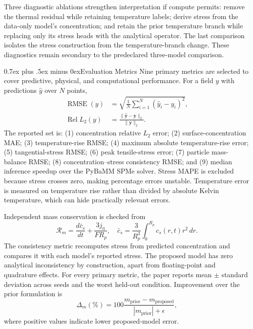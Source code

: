 \documentclass[conference]{IEEEtran}
\makeatletter
\newcommand{\headingfont}{\rmfamily}
\def\subsection{\@startsection{subsection}{2}{\z@}{1.5ex plus 1.5ex minus 0.5ex}%
{0.7ex plus .5ex minus 0ex}{\normalfont\headingfont\normalsize\bfseries}}
\makeatother
\begin{document}
Three diagnostic ablations strengthen interpretation if compute permits: remove the thermal residual while retaining temperature labels; derive stress from the data-only model's concentration; and retain the prior temperature branch while replacing only its stress heads with the analytical operator. The last comparison isolates the stress construction from the temperature-branch change. These diagnostics remain secondary to the predeclared three-model comparison.

\subsection{Evaluation Metrics}
Nine primary metrics are selected to cover predictive, physical, and computational performance. For a field $y$ with predictions $\widehat y$ over $N$ points,
\begin{align}
\operatorname{RMSE}(y)&=\sqrt{\frac{1}{N}\sum_{i=1}^{N}(\widehat y_i-y_i)^2},
\label{eq:rmse}\\
\operatorname{Rel}L_2(y)&=\frac{\|\widehat{\mathbf y}-\mathbf y\|_2}{\|\mathbf y\|_2}.
\label{eq:rell2}
\end{align}
The reported set is: (1) concentration relative $L_2$ error; (2) surface-concentration MAE; (3) temperature-rise RMSE; (4) maximum absolute temperature-rise error; (5) tangential-stress RMSE; (6) peak tensile-stress error; (7) particle mass-balance RMSE; (8) concentration--stress consistency RMSE; and (9) median inference speedup over the PyBaMM SPMe solver. Stress MAPE is excluded because stress crosses zero, making percentage errors unstable. Temperature error is measured on temperature rise rather than divided by absolute Kelvin temperature, which can hide practically relevant errors.

Independent mass conservation is checked from
\begin{equation}
\mathcal{R}_{m}=\frac{d\bar c_s}{dt}+\frac{3j_n}{FR_p},\quad
\bar c_s=\frac{3}{R_p^3}\int_0^{R_p}c_s(r,t)r^2\,dr.
\label{eq:mass}
\end{equation}
The consistency metric recomputes stress from predicted concentration and compares it with each model's reported stress. The proposed model has zero analytical inconsistency by construction, apart from floating-point and quadrature effects. For every primary metric, the paper reports mean $\pm$ standard deviation across seeds and the worst held-out condition. Improvement over the prior formulation is
\begin{equation}
\Delta_m(\%)=100\frac{m_{\mathrm{prior}}-m_{\mathrm{proposed}}}
{|m_{\mathrm{prior}}|+\epsilon},
\label{eq:gap}
\end{equation}
where positive values indicate lower proposed-model error.
\end{document}
